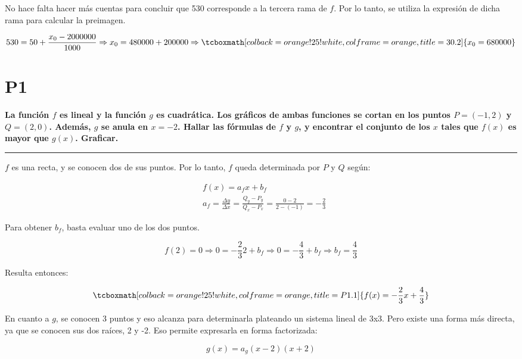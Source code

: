 \documentclass{article}
\newcommand{\hresult}[2]{\tcboxmath[colback=orange!25!white,colframe=orange, title=#1] {#2} }
\newcommand{\sectionx}[1]{\section*{#1}\label{sec:#1}\addcontentsline{toc}{section}{\nameref{sec:#1}}}
\begin{document}
No hace falta hacer más cuentas para concluir que 530 corresponde a la tercera rama de $ f $. Por lo tanto, se utiliza la expresión de dicha rama para calcular la preimagen.

\begin{equation}
530 = 50 + \frac{x_0 - 2000000}{1000} \Rightarrow x_0 = 480000 + 200000 \Rightarrow \hresult{30.2}{x_0 = 680000}
\end{equation}

\sectionx{P1}

\textbf{La función $ f $ es lineal y la función $g$ es cuadrática. Los gráficos de ambas funciones se cortan en los puntos $ P = (-1, 2) $ y $ Q = (2, 0) $. Además, $ g $ se anula en $ x = -2 $. Hallar las fórmulas de $ f $ y $ g $, y encontrar el conjunto de los $ x $ tales que $ f(x) $ es mayor que $ g(x) $. Graficar.}

\vspace{1em}
\hrule
\vspace{1em}

$ f $ es una recta, y se conocen dos de sus puntos. Por lo tanto, $ f $ queda determinada por $ P $ y $ Q $ según:

\begin{subequations}
\begin{align}
& f(x) = a_f x + b_f \\
& a_f = \frac{\Delta y}{\Delta x} = \frac{Q_y - P_y}{Q_x - P_x} = \frac{0-2}{2-(-1)} = -\frac{2}{3}
\end{align}
\end{subequations}

Para obtener $ b_f $, basta evaluar uno de los dos puntos.

\begin{equation}
f(2) = 0 \Rightarrow 0 = -\frac{2}{3} 2 + b_f \Rightarrow 0 = -\frac{4}{3} + b_f \Rightarrow b_f = \frac{4}{3}
\end{equation}

Resulta entonces:

\begin{equation}
\hresult{P1.1}{ f(x) = -\frac{2}{3} x + \frac{4}{3} }
\end{equation}

En cuanto a $ g $, se conocen 3 puntos y eso alcanza para determinarla plateando un sistema lineal de 3x3. Pero existe una forma más directa, ya que se conocen sus dos raíces, 2 y -2. Eso permite expresarla en forma factorizada:

\begin{equation}
g(x) = a_g (x-2) (x+2)
\end{equation}
\end{document}
